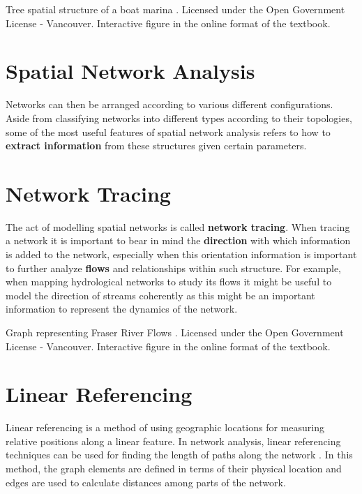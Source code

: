 \documentclass[
]{book}
\begin{document}
\label{fig:8-boat-marina}Tree spatial structure of a boat marina \citep{city_of_vancouver_open_nodate}. Licensed under the Open Government License - Vancouver. Interactive figure in the online format of the textbook.

\hypertarget{spatial-network-analysis}{%
\section{Spatial Network Analysis}\label{spatial-network-analysis}}

Networks can then be arranged according to various different configurations. Aside from classifying networks into different types according to their topologies, some of the most useful features of spatial network analysis refers to how to \textbf{extract information} from these structures given certain parameters.

\hypertarget{network-tracing}{%
\section{Network Tracing}\label{network-tracing}}

The act of modelling spatial networks is called \textbf{network tracing}. When tracing a network it is important to bear in mind the \textbf{direction} with which information is added to the network, especially when this orientation information is important to further analyze \textbf{flows} and relationships within such structure. For example, when mapping hydrological networks to study its flows it might be useful to model the direction of streams coherently as this might be an important information to represent the dynamics of the network.

\label{fig:8-fraser-river-flows}Graph representing Fraser River Flows \citep{city_of_vancouver_open_nodate}. Licensed under the Open Government License - Vancouver. Interactive figure in the online format of the textbook.

\hypertarget{linear-referencing}{%
\section{Linear Referencing}\label{linear-referencing}}

Linear referencing is a method of using geographic locations for measuring relative positions along a linear feature. In network analysis, linear referencing techniques can be used for finding the length of paths along the network \citep{ramsey_23_2012}. In this method, the graph elements are defined in terms of their physical location and edges are used to calculate distances among parts of the network.
\end{document}
